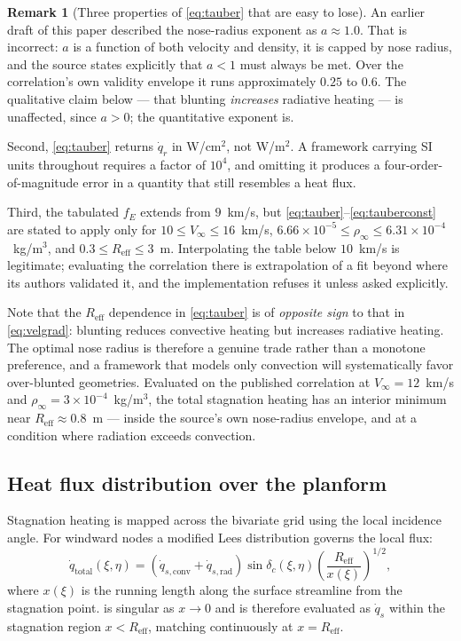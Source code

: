 \documentclass[11pt,a4paper]{article}
\theoremstyle{definition}
\newtheorem{remark}[theorem]{Remark}
\numberwithin{equation}{section}
\begin{document}
\begin{remark}[Three properties of \cref{eq:tauber} that are easy to lose]
\label{rem:tauberunits}
An earlier draft of this paper described the nose-radius exponent as $a \approx 1.0$. That is incorrect: $a$ is a function of both velocity and density, it is capped by nose radius, and the source states explicitly that $a<1$ must always be met. Over the correlation's own validity envelope it runs approximately $0.25$ to $0.6$. The qualitative claim below --- that blunting \emph{increases} radiative heating --- is unaffected, since $a>0$; the quantitative exponent is.

Second, \cref{eq:tauber} returns $\dot{q}_r$ in W/cm$^2$, not W/m$^2$. A framework carrying SI units throughout requires a factor of $10^4$, and omitting it produces a four-order-of-magnitude error in a quantity that still resembles a heat flux.

Third, the tabulated $f_E$ extends from $9$~km/s, but \cref{eq:tauber}--\cref{eq:tauberconst} are stated to apply only for $10 \le V_\infty \le 16$~km/s, $6.66\times10^{-5} \le \rho_\infty \le 6.31\times10^{-4}$~kg/m$^3$, and $0.3 \le R_{\text{eff}} \le 3$~m. Interpolating the table below $10$~km/s is legitimate; evaluating the correlation there is extrapolation of a fit beyond where its authors validated it, and the implementation refuses it unless asked explicitly.
\end{remark}

Note that the $R_{\text{eff}}$ dependence in \cref{eq:tauber} is of \emph{opposite sign} to that in \cref{eq:velgrad}: blunting reduces convective heating but increases radiative heating. The optimal nose radius is therefore a genuine trade rather than a monotone preference, and a framework that models only convection will systematically favor over-blunted geometries. Evaluated on the published correlation at $V_\infty = 12$~km/s and $\rho_\infty = 3\times10^{-4}$~kg/m$^3$, the total stagnation heating has an interior minimum near $R_{\text{eff}} \approx 0.8$~m --- inside the source's own nose-radius envelope, and at a condition where radiation exceeds convection.

\subsection{Heat flux distribution over the planform}
\label{sec:distribution}

Stagnation heating is mapped across the bivariate grid using the local incidence angle. For windward nodes a modified Lees distribution \cite{lees1956} governs the local flux:
\begin{equation}
\label{eq:lees}
\dot{q}_{\text{total}}(\xi, \eta) = \left(\dot{q}_{s,\text{conv}} + \dot{q}_{s,\text{rad}}\right)
\sin \delta_c(\xi,\eta) \left( \frac{R_{\text{eff}}}{x(\xi)} \right)^{\!1/2},
\end{equation}
where $x(\xi)$ is the running length along the surface streamline from the stagnation point.  is singular as $x \to 0$ and is therefore evaluated as $\dot{q}_s$ within the stagnation region $x < R_{\text{eff}}$, matching continuously at $x = R_{\text{eff}}$.
\end{document}
